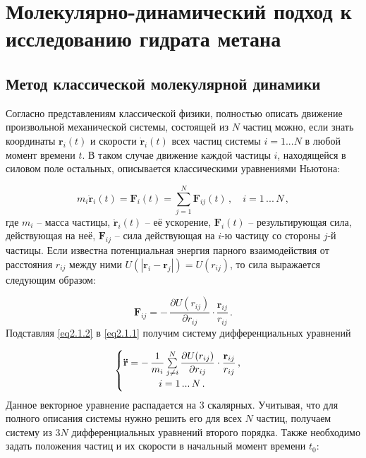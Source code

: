 \chapter{Молекулярно-динамический подход к исследованию гидрата метана}
\section{Метод классической молекулярной динамики}
\par Согласно представлениям классической физики, полностью описать движение произвольной механической системы, состоящей из $N$ частиц можно, если знать координаты $\mathbf{r}_i(t)$ и скорости $\mathbf{\dot{r}}_i(t)$ всех частиц системы $i=1...N$ в любой момент времени $t$. В таком случае движение каждой частицы $i$, находящейся в силовом поле остальных, описывается классическими уравнениями Ньютона:

\begin{equation}
    m_i \mathbf{\ddot{r}}_i(t) = \mathbf{F}_i(t) = \sum\limits_{j=1}^{N} \mathbf{F}_{ij}(t)\,,\quad i = 1\,...\,N \,,
    \label{eq2.1.1}
\end{equation}
где $m_i$ -- масса частицы, $\mathbf{\ddot{r}}_i(t)$ -- её ускорение, $\mathbf{F}_i(t)$ -- результирующая сила, действующая на неё, $\mathbf{F}_{ij}$ -- сила действующая на $i$-ю частицу со стороны $j$-й частицы. Если известна потенциальная энергия парного взаимодействия от расстояния $r_{ij}$ между ними $U(|\mathbf{r}_i-\mathbf{r}_j|) = U(r_{ij})$, то сила выражается следующим образом:

\begin{equation}
    \mathbf{F}_{ij} = -\,\dfrac{\partial U(r_{ij})}{\partial r_{ij}}\cdot\dfrac{\mathbf{r}_{ij}}{r_{ij}}\,.
    \label{eq2.1.2}
\end{equation}
Подставляя \eqref{eq2.1.2} в \eqref{eq2.1.1} получим систему дифференциальных уравнений

\begin{equation}
    \begin{cases}
        \mathbf{\ddot{r}} = -\,\dfrac{1}{m_i}\sum\limits_{j\neq i}^N \dfrac{\partial U(r_{ij})}{\partial r_{ij}}\cdot\dfrac{\mathbf{r}_{ij}}{r_{ij}}\,, \\
        \hfil i = 1\, ...\, N\,.
    \end{cases}
    \label{eq2.1.3}
\end{equation}
Данное векторное уравнение распадается на 3 скалярных. Учитывая, что для полного описания системы нужно решить его для всех $N$ частиц, получаем систему из $3N$ дифференциальных уравнений второго порядка. Также необходимо задать положения частиц и их скорости в начальный момент времени $t_0$:

